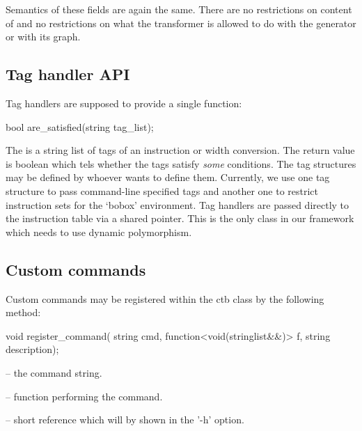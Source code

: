 Semantics of these fields are again the same. There are no restrictions on content of  and no restrictions on what the transformer is allowed to do with the generator or with its graph.

\subsection{Tag handler API}

Tag handlers are supposed to provide a single function:
\begin{code}
bool are_satisfied(string tag_list);
\end{code}

The  is a string list of tags of an instruction or width conversion. The return value is boolean which tels whether the tags satisfy \emph{some} conditions. The tag structures may be defined by whoever wants to define them. Currently, we use one tag structure to pass command-line specified tags and another one to restrict instruction sets for the `bobox' environment. Tag handlers are passed directly to the instruction table via a shared pointer. This is the only class in our framework which needs to use dynamic polymorphism.

\subsection{Custom commands}

Custom commands may be registered within the ctb class by the following method:
\begin{code}
void register_command( string cmd, function<void(stringlist&&)> f,
  string description);
\end{code}

\begin{description}
\item {} -- the command string.
\item {} -- function performing the command.
\item {} -- short reference which will by shown in the '-h' option.
\end{description}

  


